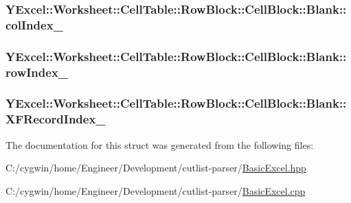 \subsubsection[{col\+Index\+\_\+}]{ Y\+Excel\+::\+Worksheet\+::\+Cell\+Table\+::\+Row\+Block\+::\+Cell\+Block\+::\+Blank\+::col\+Index\+\_\+}\label{struct_y_excel_1_1_worksheet_1_1_cell_table_1_1_row_block_1_1_cell_block_1_1_blank_ab619c40a14f9d011eb1b13e4e15a4f85}
\hypertarget{struct_y_excel_1_1_worksheet_1_1_cell_table_1_1_row_block_1_1_cell_block_1_1_blank_a86116ca91549843e70128548ae091d17}{}
\subsubsection[{row\+Index\+\_\+}]{ Y\+Excel\+::\+Worksheet\+::\+Cell\+Table\+::\+Row\+Block\+::\+Cell\+Block\+::\+Blank\+::row\+Index\+\_\+}\label{struct_y_excel_1_1_worksheet_1_1_cell_table_1_1_row_block_1_1_cell_block_1_1_blank_a86116ca91549843e70128548ae091d17}
\hypertarget{struct_y_excel_1_1_worksheet_1_1_cell_table_1_1_row_block_1_1_cell_block_1_1_blank_ac9477840d4396ee7c3dd24c09cd5ae97}{}
\subsubsection[{X\+F\+Record\+Index\+\_\+}]{ Y\+Excel\+::\+Worksheet\+::\+Cell\+Table\+::\+Row\+Block\+::\+Cell\+Block\+::\+Blank\+::\+X\+F\+Record\+Index\+\_\+}\label{struct_y_excel_1_1_worksheet_1_1_cell_table_1_1_row_block_1_1_cell_block_1_1_blank_ac9477840d4396ee7c3dd24c09cd5ae97}


The documentation for this struct was generated from the following files\+:\begin{DoxyCompactItemize}
\item 
C\+:/cygwin/home/\+Engineer/\+Development/cutlist-\/parser/\hyperlink{_basic_excel_8hpp}{Basic\+Excel.\+hpp}\item 
C\+:/cygwin/home/\+Engineer/\+Development/cutlist-\/parser/\hyperlink{_basic_excel_8cpp}{Basic\+Excel.\+cpp}\end{DoxyCompactItemize}
